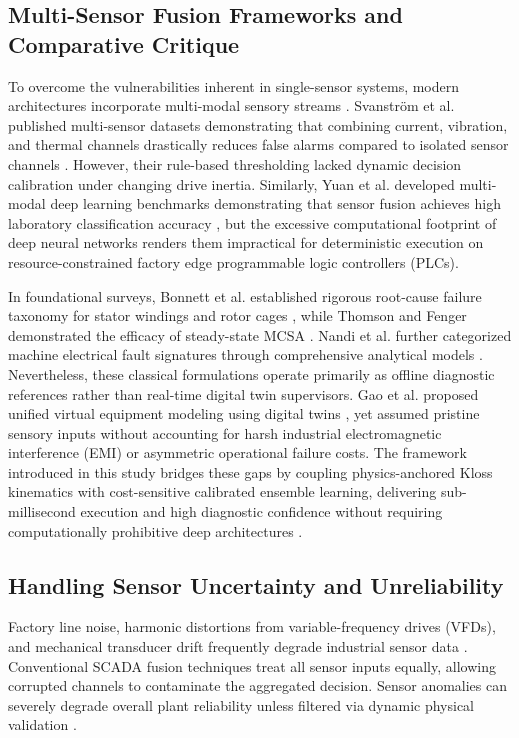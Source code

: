 \documentclass[conference]{IEEEtran}
\begin{document}
\subsection{Multi-Sensor Fusion Frameworks and Comparative Critique}
To overcome the vulnerabilities inherent in single-sensor systems, modern architectures incorporate multi-modal sensory streams \cite{ref1}. Svanstr{\"o}m et al. published multi-sensor datasets demonstrating that combining current, vibration, and thermal channels drastically reduces false alarms compared to isolated sensor channels \cite{ref4}. However, their rule-based thresholding lacked dynamic decision calibration under changing drive inertia. Similarly, Yuan et al. developed multi-modal deep learning benchmarks demonstrating that sensor fusion achieves high laboratory classification accuracy \cite{ref5}, but the excessive computational footprint of deep neural networks renders them impractical for deterministic execution on resource-constrained factory edge programmable logic controllers (PLCs).

In foundational surveys, Bonnett et al. established rigorous root-cause failure taxonomy for stator windings and rotor cages \cite{ref1}, while Thomson and Fenger demonstrated the efficacy of steady-state MCSA \cite{ref2}. Nandi et al. further categorized machine electrical fault signatures through comprehensive analytical models \cite{ref3}. Nevertheless, these classical formulations operate primarily as offline diagnostic references rather than real-time digital twin supervisors. Gao et al. proposed unified virtual equipment modeling using digital twins \cite{ref6}, yet assumed pristine sensory inputs without accounting for harsh industrial electromagnetic interference (EMI) or asymmetric operational failure costs. The framework introduced in this study bridges these gaps by coupling physics-anchored Kloss kinematics with cost-sensitive calibrated ensemble learning, delivering sub-millisecond execution and high diagnostic confidence without requiring computationally prohibitive deep architectures \cite{ref7}.

\subsection{Handling Sensor Uncertainty and Unreliability}
Factory line noise, harmonic distortions from variable-frequency drives (VFDs), and mechanical transducer drift frequently degrade industrial sensor data \cite{ref1,ref7}. Conventional SCADA fusion techniques treat all sensor inputs equally, allowing corrupted channels to contaminate the aggregated decision. Sensor anomalies can severely degrade overall plant reliability unless filtered via dynamic physical validation \cite{ref7}.
\end{document}
